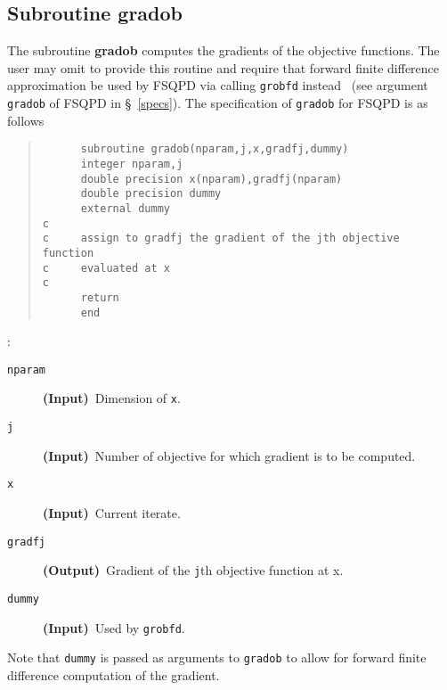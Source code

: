 \subsection{Subroutine gradob} 
\label{subgradob}
The subroutine {\bf gradob} computes the gradients of the 
objective functions.
The user may omit to provide this routine and require that 
forward finite difference
approximation be used by FSQPD via calling {\tt grobfd} instead~
(see argument {\tt gradob} of FSQPD in \S~\ref{specs}).
The specification of {\tt gradob} for FSQPD is as follows
\begin{quote}
\begin{verbatim}
      subroutine gradob(nparam,j,x,gradfj,dummy)
      integer nparam,j
      double precision x(nparam),gradfj(nparam)
      double precision dummy
      external dummy
c     
c     assign to gradfj the gradient of the jth objective function 
c     evaluated at x
c
      return
      end
\end{verbatim}
\end{quote}
:
\begin{description}
\item[\tt nparam] {\bf (Input)}~Dimension of {\tt x}.
\item[\tt j]      {\bf (Input)}~Number of objective for 
                  which gradient is to be computed.
\item[\tt x]      {\bf (Input)}~Current iterate.
\item[\tt gradfj]  {\bf (Output)}~Gradient of the {\tt j}th objective 
                   function at x.
\item[\tt dummy]  {\bf (Input)}~Used by {\tt grobfd}.
\end{description}
Note that {\tt  dummy} is 
passed as arguments to {\tt gradob} to allow for forward finite 
difference computation of the gradient.

